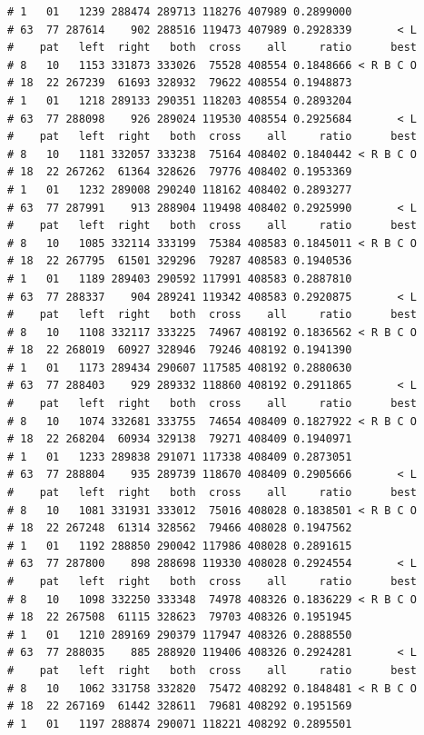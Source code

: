 \documentclass{article}\usepackage[]{graphicx}\usepackage[]{color}
\makeatletter
\newenvironment{kframe}{%
 \def\at@end@of@kframe{}%
 \ifinner\ifhmode%
  \def\at@end@of@kframe{\end{minipage}}%
  \begin{minipage}{\columnwidth}%
 \fi\fi%
 \def\FrameCommand##1{\hskip\@totalleftmargin \hskip-\fboxsep
 \colorbox{shadecolor}{##1}\hskip-\fboxsep
     \hskip-\linewidth \hskip-\@totalleftmargin \hskip\columnwidth}%
 \MakeFramed {\advance\hsize-\width
   \@totalleftmargin\z@ \linewidth\hsize
   \@setminipage}}%
 {\par\unskip\endMakeFramed%
 \at@end@of@kframe}
\newenvironment{knitrout}{}{} %
\makeatother
\begin{document}
\begin{knitrout}
\begin{kframe}
\begin{verbatim}
# 1   01   1239 288474 289713 118276 407989 0.2899000          
# 63  77 287614    902 288516 119473 407989 0.2928339       < L
#    pat   left  right   both  cross    all     ratio      best
# 8   10   1153 331873 333026  75528 408554 0.1848666 < R B C O
# 18  22 267239  61693 328932  79622 408554 0.1948873          
# 1   01   1218 289133 290351 118203 408554 0.2893204          
# 63  77 288098    926 289024 119530 408554 0.2925684       < L
#    pat   left  right   both  cross    all     ratio      best
# 8   10   1181 332057 333238  75164 408402 0.1840442 < R B C O
# 18  22 267262  61364 328626  79776 408402 0.1953369          
# 1   01   1232 289008 290240 118162 408402 0.2893277          
# 63  77 287991    913 288904 119498 408402 0.2925990       < L
#    pat   left  right   both  cross    all     ratio      best
# 8   10   1085 332114 333199  75384 408583 0.1845011 < R B C O
# 18  22 267795  61501 329296  79287 408583 0.1940536          
# 1   01   1189 289403 290592 117991 408583 0.2887810          
# 63  77 288337    904 289241 119342 408583 0.2920875       < L
#    pat   left  right   both  cross    all     ratio      best
# 8   10   1108 332117 333225  74967 408192 0.1836562 < R B C O
# 18  22 268019  60927 328946  79246 408192 0.1941390          
# 1   01   1173 289434 290607 117585 408192 0.2880630          
# 63  77 288403    929 289332 118860 408192 0.2911865       < L
#    pat   left  right   both  cross    all     ratio      best
# 8   10   1074 332681 333755  74654 408409 0.1827922 < R B C O
# 18  22 268204  60934 329138  79271 408409 0.1940971          
# 1   01   1233 289838 291071 117338 408409 0.2873051          
# 63  77 288804    935 289739 118670 408409 0.2905666       < L
#    pat   left  right   both  cross    all     ratio      best
# 8   10   1081 331931 333012  75016 408028 0.1838501 < R B C O
# 18  22 267248  61314 328562  79466 408028 0.1947562          
# 1   01   1192 288850 290042 117986 408028 0.2891615          
# 63  77 287800    898 288698 119330 408028 0.2924554       < L
#    pat   left  right   both  cross    all     ratio      best
# 8   10   1098 332250 333348  74978 408326 0.1836229 < R B C O
# 18  22 267508  61115 328623  79703 408326 0.1951945          
# 1   01   1210 289169 290379 117947 408326 0.2888550          
# 63  77 288035    885 288920 119406 408326 0.2924281       < L
#    pat   left  right   both  cross    all     ratio      best
# 8   10   1062 331758 332820  75472 408292 0.1848481 < R B C O
# 18  22 267169  61442 328611  79681 408292 0.1951569          
# 1   01   1197 288874 290071 118221 408292 0.2895501          

\end{verbatim}
\end{kframe}
\end{knitrout}
\end{document}
